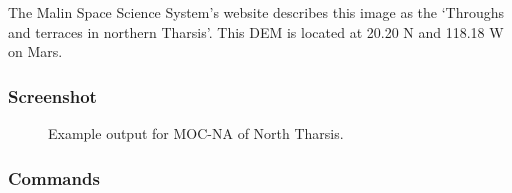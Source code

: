 The Malin Space Science System's website describes this image as the
`Throughs and terraces in northern Tharsis'. This DEM is located at
20.20 N and 118.18 W on Mars.

\subsubsection*{Screenshot}

\begin{figure}[h!]
\centering
  \hfil
\caption{Example output for MOC-NA of North Tharsis.}
\label{fig:mocna_n_tharsis_example}
\end{figure}

\subsubsection*{Commands}

